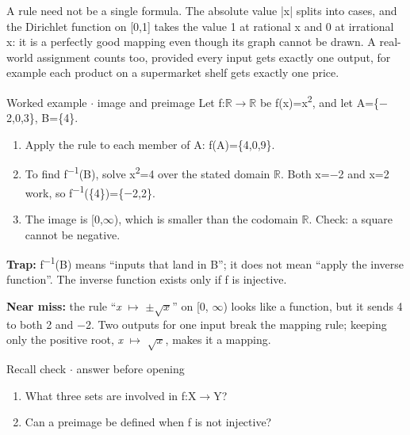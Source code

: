 \documentclass[11pt]{article}
\begin{document}
\begin{keepsection}
A rule need not be a single formula. The absolute value |x| splits into cases, and the Dirichlet function on [0,1] takes the value 1 at rational x and 0 at irrational x: it is a perfectly good mapping even though its graph cannot be drawn. A real-world assignment counts too, provided every input gets exactly one output, for example each product on a supermarket shelf gets exactly one price.

\begin{workedbox}{Worked example \ensuremath{\cdot} image and preimage}
Let f:\ensuremath{\mathbb{R}}\ensuremath{\to}\ensuremath{\mathbb{R}} be f(x)=x\textsuperscript{2}, and let A=\{\ensuremath{-}2,0,3\}, B=\{4\}.

\begin{enumerate}
\item Apply the rule to each member of A: f(A)=\{4,0,9\}.
\item To find f\textsuperscript{\ensuremath{-}1}(B), solve x\textsuperscript{2}=4 over the stated domain \ensuremath{\mathbb{R}}. Both x=\ensuremath{-}2 and x=2 work, so f\textsuperscript{\ensuremath{-}1}(\{4\})=\{\ensuremath{-}2,2\}.
\item The image is [0,\ensuremath{\infty}), which is smaller than the codomain \ensuremath{\mathbb{R}}. Check: a square cannot be negative.
\end{enumerate}
\end{workedbox}

\begin{notebox}\textbf{Trap:} f\textsuperscript{\ensuremath{-}1}(B) means “inputs that land in B”; it does not mean “apply the inverse function”. The inverse function exists only if f is injective.\end{notebox}

\begin{notebox}\textbf{Near miss:} the rule “\textit{x} \ensuremath{\mapsto} \ensuremath{\pm}\ensuremath{\sqrt{{x}}}” on [0, \ensuremath{\infty}) looks like a function, but it sends 4 to both 2 and \ensuremath{-}2. Two outputs for one input break the mapping rule; keeping only the positive root, \textit{x} \ensuremath{\mapsto} \ensuremath{\sqrt{{x}}}, makes it a mapping.\end{notebox}

\begin{recallbox}{Recall check \ensuremath{\cdot} answer before opening}
\begin{enumerate}
\item What three sets are involved in f:X\ensuremath{\to}Y?
\item Can a preimage be defined when f is not injective?
\end{enumerate}

\end{recallbox}
\end{keepsection}
\end{document}
